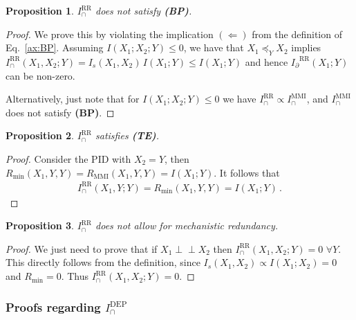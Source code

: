 \documentclass{article}
\newcommand{\ind}{\mathrel{\perp\!\!\!\perp}}
\newcommand{\Ip}{\ensuremath{I_\partial}\xspace}
\newcommand{\BP}{\textbf{(BP)}\xspace} %
\newcommand{\TE}{\textbf{(TE)}\xspace} %
\newcommand{\IMMI}{\ensuremath{I_\cap^{\text{MMI}}}\xspace}
\newcommand{\IRR}{\ensuremath{I_\cap^{\text{RR}}}\xspace}
\newcommand{\IDEP}{\ensuremath{I_\cap^{\text{DEP}}}\xspace}
\newcommand{\IRRs}{\ensuremath{I_\cap^{\text{RR}}(X_1,X_2;Y)}\xspace}
\newtheorem{proposition}{Proposition}
\begin{document}
\begin{proposition} \label{prop:RR-noBP}
    $\IRR$ does not satisfy \BP.
\end{proposition}
\begin{proof}
    We prove this by violating the implication $(\Longleftarrow)$ from the definition of Eq.~\eqref{ax:BP}. Assuming $I(X_1;X_2;Y)\le0$, we have that $X_1\preceq_Y X_2$ implies $\IRR(X_1,X_2;Y)=I_s(X_1,X_2)\,I(X_1;Y)\leq I(X_1;Y)$ and hence $\Ip^\text{RR}(X_1;Y)$ can be non-zero.

    Alternatively, just note that for $I(X_1;X_2;Y)\le0$ we have $\IRR\propto \IMMI$, and \IMMI does not satisfy \BP.
\end{proof}

\begin{proposition}\label{prop:RR-TE}
    $\IRR$ satisfies \TE.
\end{proposition}
\begin{proof}
    Consider the PID with $X_2=Y$, then $R_\text{min}(X_1,Y,Y)=R_\text{MMI}(X_1,Y,Y) = I(X_1;Y)$. It follows that
    \begin{equation}
        \begin{aligned}
            \IRR(X_1,Y;Y)=R_\text{min}(X_1,Y,Y)=I(X_1;Y) \,.
        \end{aligned}
    \end{equation}
\end{proof}

\begin{proposition}\label{prop:RR-noMechRed}
    $\IRR$ does not allow for mechanistic redundancy.
\end{proposition}
\begin{proof}
    We just need to prove that if $X_1\ind X_2$ then $\IRR(X_1,X_2;Y)=0$ $\forall Y$. This directly follows from the definition, since $I_s(X_1,X_2)\propto I(X_1;X_2)=0$ and $R_{\min}=0$. Thus $\IRRs=0$.  
\end{proof}

\subsubsection{Proofs regarding \IDEP}
\end{document}
